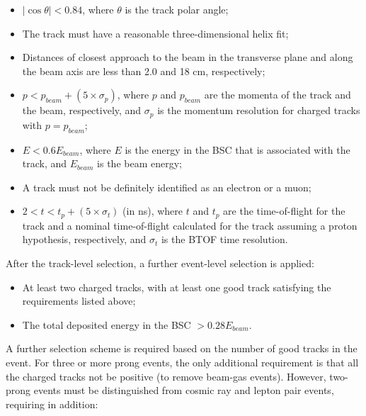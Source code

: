\begin{itemize}
\item $|\cos \theta| < 0.84$, where $\theta$ is the track polar angle;
\item The track must have a reasonable three-dimensional helix fit;
\item Distances of closest approach to the beam in the transverse plane
      and along the beam axis are less than 2.0 and 18 cm,
      respectively;
\item $p < p_{beam} + (5 \times \sigma_{p})$, where $p$ and $p_{beam}$
      are the momenta of the track and the beam, respectively, and
      $\sigma_p$ is the momentum resolution for charged tracks
      with $p=p_{beam}$;
\item $E < 0.6 E_{beam}$, where $E$ is the energy in the BSC 
      that is associated with the track, and $E_{beam}$
      is the beam energy;
\item A track must not be definitely identified as an electron or a muon;
\item $2 < t < t_{p} + (5 \times \sigma_{t})$ (in ns), where $t$ and
      $t_{p}$ are the time-of-flight for the track and a nominal
      time-of-flight calculated for the track assuming a proton
      hypothesis, respectively, and $\sigma_{t}$ is the BTOF time
      resolution.
\end{itemize}

After the track-level selection, a further event-level selection is
applied:

\begin{itemize}
\item At least two charged tracks, with at least one good track
satisfying the requirements listed above;
\item The total deposited energy in the BSC $> 0.28 E_{beam}$.
\end{itemize}

A further selection scheme is required based on the number of good
tracks in the event.  For three or more prong events, the only
additional requirement is that all the charged tracks not be positive
(to remove beam-gas events).  However, two-prong events must be
distinguished from cosmic ray and lepton pair events, requiring
in addition:

